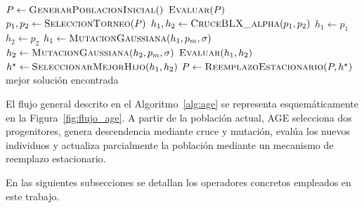 \begin{algorithm}[H]
    \begin{algorithmic}[1]
        \State $P \gets \textsc{GenerarPoblacionInicial}()$
        \State $\textsc{Evaluar}(P)$
        \State $p_1, p_2 \gets \textsc{SeleccionTorneo}(P)$
        \State $h_1, h_2 \gets \textsc{CruceBLX\_alpha}(p_1, p_2)$
        \Else
        \State $h_1 \gets p_1$
        \State $h_2 \gets p_2$
        \EndIf
        \State $h_1 \gets \textsc{MutacionGaussiana}(h_1, p_m, \sigma)$
        \State $h_2 \gets \textsc{MutacionGaussiana}(h_2, p_m, \sigma)$
        \State $\textsc{Evaluar}(h_1, h_2)$
        \State $h^\star \gets \textsc{SeleccionarMejorHijo}(h_1, h_2)$
        \State $P \gets \textsc{ReemplazoEstacionario}(P, h^\star)$
        \EndWhile
        \State \Return mejor solución encontrada
    \end{algorithmic}
    \caption{Algoritmo Genético Estacionario (AGE).}
    \label{alg:age}
\end{algorithm}

El flujo general descrito en el Algoritmo~\ref{alg:age} se representa esquemáticamente en la Figura~\ref{fig:flujo_age}. A partir de la población actual, AGE selecciona dos progenitores, genera descendencia mediante cruce y mutación, evalúa los nuevos individuos y actualiza parcialmente la población mediante un mecanismo de reemplazo estacionario.

En las siguientes subsecciones se detallan los operadores concretos empleados en este trabajo.




